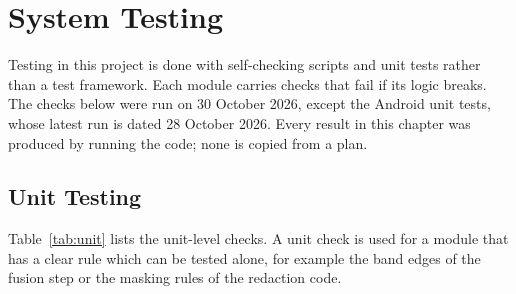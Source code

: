 \chapter{System Testing}\thispagestyle{thesisstyle} %
\graphicspath{{Chapter6/}}
{

Testing in this project is done with self-checking scripts and unit tests rather than a test framework. Each module carries checks that fail if its logic breaks. The checks below were run on 30 October 2026, except the Android unit tests, whose latest run is dated 28 October 2026. Every result in this chapter was produced by running the code; none is copied from a plan.

\section{Unit Testing}\label{sec:ut}
Table~\ref{tab:unit} lists the unit-level checks. A unit check is used for a module that has a clear rule which can be tested alone, for example the band edges of the fusion step or the masking rules of the redaction code.

}
